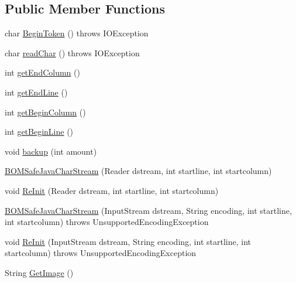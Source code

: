 \subsection*{Public Member Functions}
\begin{DoxyCompactItemize}
\item 
char \hyperlink{classuk_1_1ac_1_1manchester_1_1cs_1_1_b_o_m_safe_java_char_stream_a5920c61b477775b3ecfc2ec254942824}{Begin\-Token} ()  throws I\-O\-Exception 
\item 
char \hyperlink{classuk_1_1ac_1_1manchester_1_1cs_1_1_b_o_m_safe_java_char_stream_acb8b025121b480889849717d62a80b33}{read\-Char} ()  throws I\-O\-Exception 
\item 
int \hyperlink{classuk_1_1ac_1_1manchester_1_1cs_1_1_b_o_m_safe_java_char_stream_a034104c0a7a20f0a69fd3a771f240643}{get\-End\-Column} ()
\item 
int \hyperlink{classuk_1_1ac_1_1manchester_1_1cs_1_1_b_o_m_safe_java_char_stream_a08cb0583b4a8150f64e03409b583adb4}{get\-End\-Line} ()
\item 
int \hyperlink{classuk_1_1ac_1_1manchester_1_1cs_1_1_b_o_m_safe_java_char_stream_a259d6521e877084142bec42eafc8526c}{get\-Begin\-Column} ()
\item 
int \hyperlink{classuk_1_1ac_1_1manchester_1_1cs_1_1_b_o_m_safe_java_char_stream_a5efa4ae7a6a12f0fee65adcb8223e54f}{get\-Begin\-Line} ()
\item 
void \hyperlink{classuk_1_1ac_1_1manchester_1_1cs_1_1_b_o_m_safe_java_char_stream_ab9a79366186b5646b1f4c73389684c4e}{backup} (int amount)
\item 
\hyperlink{classuk_1_1ac_1_1manchester_1_1cs_1_1_b_o_m_safe_java_char_stream_a2410d9e837bb1c5a7bc3377905848cfc}{B\-O\-M\-Safe\-Java\-Char\-Stream} (Reader dstream, int startline, int startcolumn)
\item 
void \hyperlink{classuk_1_1ac_1_1manchester_1_1cs_1_1_b_o_m_safe_java_char_stream_a78396936de46eb9a86045581ea143fb5}{Re\-Init} (Reader dstream, int startline, int startcolumn)
\item 
\hyperlink{classuk_1_1ac_1_1manchester_1_1cs_1_1_b_o_m_safe_java_char_stream_a96bcc8bd6cdcc5171001e7054cb98a86}{B\-O\-M\-Safe\-Java\-Char\-Stream} (Input\-Stream dstream, String encoding, int startline, int startcolumn)  throws Unsupported\-Encoding\-Exception 
\item 
void \hyperlink{classuk_1_1ac_1_1manchester_1_1cs_1_1_b_o_m_safe_java_char_stream_adae38ac3edb2809a6457b56dd545c052}{Re\-Init} (Input\-Stream dstream, String encoding, int startline, int startcolumn)  throws Unsupported\-Encoding\-Exception 
\item 
String \hyperlink{classuk_1_1ac_1_1manchester_1_1cs_1_1_b_o_m_safe_java_char_stream_a174fc74a1f0cbbc1b8ef545270ebb0d8}{Get\-Image} ()
\end{DoxyCompactItemize}
